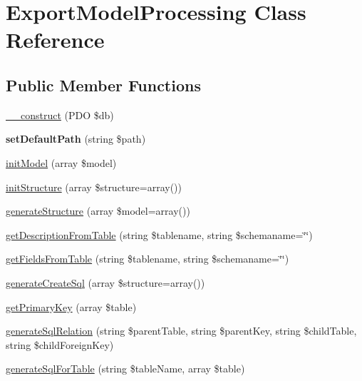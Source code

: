\hypertarget{classExportModelProcessing}{}\section{Export\+Model\+Processing Class Reference}
\label{classExportModelProcessing}
\subsection*{Public Member Functions}
\begin{DoxyCompactItemize}
\item 
\hyperlink{classExportModelProcessing_a5f3544bdd5de2c528d301db24751a90a}{\+\_\+\+\_\+construct} (P\+DO \$db)
\item 
\mbox{\label{classExportModelProcessing_a43f822b0753caf336b74abe8e60f14b3}} 
{\bfseries set\+Default\+Path} (string \$path)
\item 
\hyperlink{classExportModelProcessing_ab74a02a40ccfff57494986e1c038cad5}{init\+Model} (array \$model)
\item 
\hyperlink{classExportModelProcessing_a2e0ab00ea8525229c72da1abda3d3043}{init\+Structure} (array \$structure=array())
\item 
\hyperlink{classExportModelProcessing_a2c083b18ab22fc95db1939ccf14c9a46}{generate\+Structure} (array \$model=array())
\item 
\hyperlink{classExportModelProcessing_ae31ea6c13d62aebabcdd2a6ff904474b}{get\+Description\+From\+Table} (string \$tablename, string \$schemaname=\char`\"{}\char`\"{})
\item 
\hyperlink{classExportModelProcessing_a1bc41fccfbce6de5b4e167eb9937f488}{get\+Fields\+From\+Table} (string \$tablename, string \$schemaname=\char`\"{}\char`\"{})
\item 
\hyperlink{classExportModelProcessing_a55bf879da8bb3b010e36939195ff7756}{generate\+Create\+Sql} (array \$structure=array())
\item 
\hyperlink{classExportModelProcessing_ae891c1f59aee9f32d1de48d4e88bec19}{get\+Primary\+Key} (array \$table)
\item 
\hyperlink{classExportModelProcessing_a2f3b9bd68cbcef66ed9acd888ceb65a2}{generate\+Sql\+Relation} (string \$parent\+Table, string \$parent\+Key, string \$child\+Table, string \$child\+Foreign\+Key)
\item 
\hyperlink{classExportModelProcessing_adfa4dd7271ec720245cb2f6845b983cc}{generate\+Sql\+For\+Table} (string \$table\+Name, array \$table)

\end{DoxyCompactItemize}

